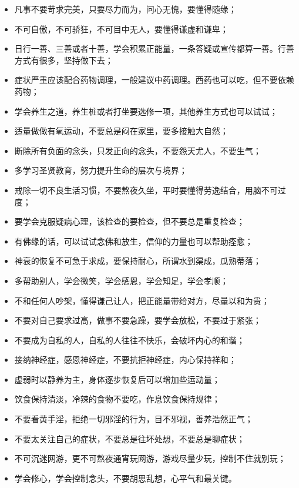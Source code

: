 \begin{itemize}
    \item 凡事不要苛求完美，只要尽力而为，问心无愧，要懂得随缘；
    \item 不可自傲，不可骄狂，不可目中无人，要懂得谦虚和谦卑；
    \item 日行一善、三善或者十善，学会积累正能量，一条答疑或宣传都算一善。行善方式有很多，坚持做下去；
    \item 症状严重应该配合药物调理，一般建议中药调理。西药也可以吃，但不要依赖药物；
    \item 学会养生之道，养生桩或者打坐要选修一项，其他养生方式也可以试试；
    \item 适量做做有氧运动，不要总是闷在家里，要多接触大自然；
    \item 断除所有负面的念头，只发正向的念头，不要怨天尤人，不要生气；
    \item 多学习圣贤教育，努力提升生命的层次与境界；
    \item 戒除一切不良生活习惯，不要熬夜久坐，平时要懂得劳逸结合，用脑不可过度；
    \item 要学会克服疑病心理，该检查的要检查，但不要总是重复检查；
    \item 有佛缘的话，可以试试念佛和放生，信仰的力量也可以帮助痊愈；
    \item 神衰的恢复不可急于求成，要保持耐心，所谓水到渠成，瓜熟蒂落；
    \item 多帮助别人，学会微笑，学会感恩，学会知足，学会孝顺；
    \item 不和任何人吵架，懂得谦己让人，把正能量带给对方，尽量以和为贵；
    \item 不要对自己要求过高，做事不要急躁，要学会放松，不要过于紧张；
    \item 不要成为自私的人，自私的人往往不快乐，会破坏内心的和谐；
    \item 接纳神经症，感恩神经症，不要抗拒神经症，内心保持祥和；
    \item 虚弱时以静养为主，身体逐步恢复后可以增加些运动量；
    \item 饮食保持清淡，冷辣的食物不要吃，作息饮食保持规律；
    \item 不要看黄手淫，拒绝一切邪淫的行为，目不邪视，善养浩然正气；
    \item 不要太关注自己的症状，不要总是往坏处想，不要总是聊症状；
    \item 不可沉迷网游，更不可熬夜通宵玩网游，游戏尽量少玩，控制不住就别玩；
    \item 学会修心，学会控制念头，不要胡思乱想，心平气和最关键。
\end{itemize}

